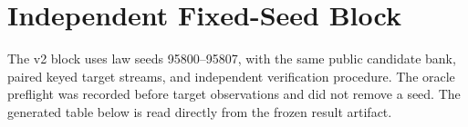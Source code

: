 \documentclass[opre,dblanonrev]{informs4}
\begin{document}
\section{Independent Fixed-Seed Block}

The v2 block uses law seeds 95800--95807, with the same public candidate bank,
paired keyed target streams, and independent verification procedure.  The
oracle preflight was recorded before target observations and did not remove a
seed.  The generated table below is read directly from the frozen result
artifact.


\end{document}
